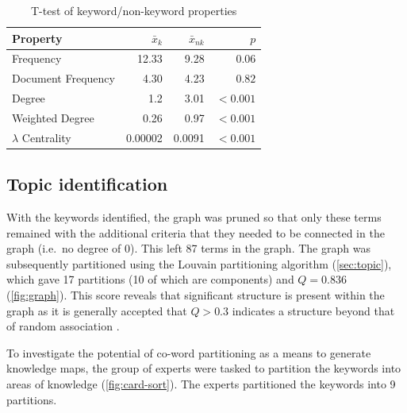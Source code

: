 \documentclass[a4paper, 11pt]{article}
\begin{document}
\begin{table}[t]
  \centering
  \caption{T-test of keyword/non-keyword properties}\label{tbl:props}
  \begin{tabular}{l r r r}
    \toprule
    Property & $\bar{x}_k$ & $\bar{x}_{nk}$ & $p$ \\
    \midrule
    Frequency & 12.33 & 9.28 & $0.06$ \\
    Document Frequency & 4.30 & 4.23 & $0.82$ \\
    Degree & 1.2 & 3.01 & $<0.001$ \\
    Weighted Degree & 0.26 & 0.97 & $<0.001$ \\
    $\lambda$ Centrality & 0.00002 & 0.0091 & $<0.001$ \\
    \bottomrule
  \end{tabular}
\end{table}

\subsection{Topic identification}

With the keywords identified, the graph was pruned so that only these terms remained with the additional criteria that they needed to be connected in the graph (i.e.\ no degree of 0). This left 87 terms in the graph. The graph was subsequently partitioned using the Louvain partitioning algorithm (\cref{sec:topic}), which gave 17 partitions (10 of which are components) and $Q=0.836$ (\cref{fig:graph}). This score reveals that significant structure is present within the graph as it is generally accepted that $Q>0.3$ indicates a structure beyond that of random association \parencite{newman2004}.

To investigate the potential of co-word partitioning as a means to generate knowledge maps, the group of experts were tasked to partition the keywords into areas of knowledge (\cref{fig:card-sort}). The experts partitioned the keywords into 9 partitions.
\end{document}
